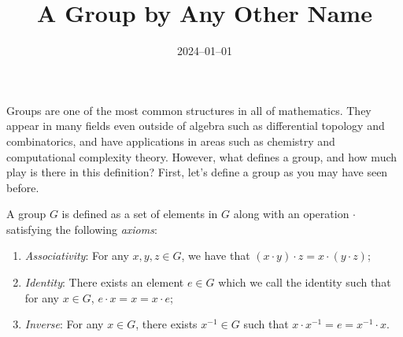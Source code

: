\documentclass{article}
\title{A Group by Any \newline Other Name}
\date{2024--01--01}
\begin{document}
\maketitle


%

Groups are one of the most common structures in all of mathematics.
They appear in many fields even outside of algebra such as differential topology and combinatorics, and have applications in areas such as chemistry and computational complexity theory.
However, what defines a group, and how much play is there in this definition?
First, let's define a group as you may have seen before.

\begin{defn}
  A group $G$ is defined as a set of elements in $G$ along with an operation $\cdot$ satisfying the following \emph{axioms}:
  \begin{enumerate}
  \item \emph{Associativity}: For any $x, y, z \in G$, we have that $(x \cdot y) \cdot z = x \cdot (y \cdot z)$;
  \item \emph{Identity}: There exists an element $e \in G$ which we call the identity such that for any $x \in G$, $e \cdot x = x = x \cdot e$;
  \item \emph{Inverse}: For any $x \in G$, there exists $x^{-1} \in G$ such that $x \cdot x^{-1} = e = x^{-1} \cdot x$.
  \end{enumerate}
\end{defn}
\end{document}
